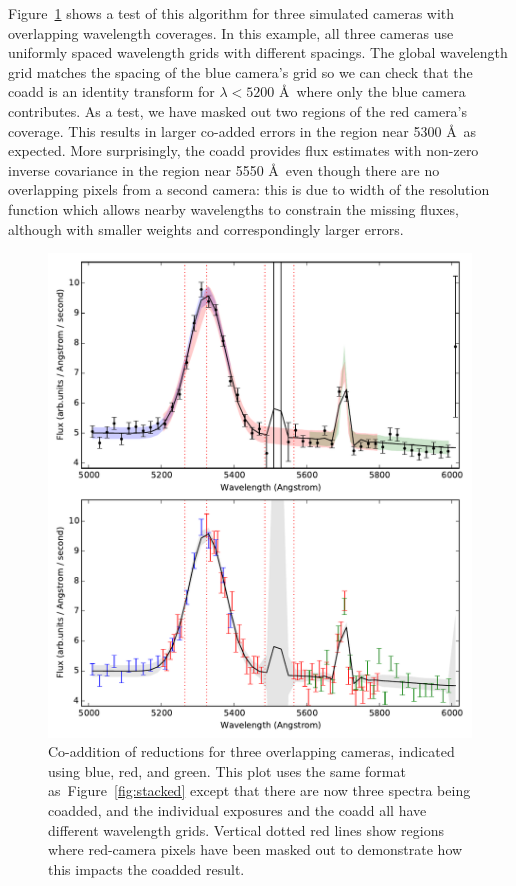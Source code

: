 \documentclass[12pt]{article}
\providecommand{\fig}[1]{Figure~\ref{fig:#1}}
\begin{document}
\fig{global} shows a test of this algorithm for three simulated cameras with overlapping wavelength coverages. In this example, all three cameras use uniformly spaced wavelength grids with different spacings.  The global wavelength grid matches the spacing of the blue camera's grid so we can check that the coadd is an identity transform for $\lambda < 5200$ \AA\ where only the blue camera contributes. As a test, we have masked out two regions of the red camera's coverage. This results in larger co-added errors in the region near 5300 \AA\, as expected. More surprisingly, the coadd provides flux estimates with non-zero inverse covariance in the region near 5550 \AA\, even though there are no overlapping pixels from a second camera: this is due to width of the resolution function which allows nearby wavelengths to constrain the missing fluxes, although with smaller weights and correspondingly larger errors.

\begin{figure}[htb]
\begin{center}
\includegraphics[width=5in]{fig/global}
\caption{Co-addition of reductions for three overlapping cameras, indicated using blue, red, and green. This plot uses the same format as~\fig{stacked} except that there are now three spectra being coadded, and the individual exposures and the coadd all have different wavelength grids. Vertical dotted red lines show regions where red-camera pixels have been masked out to demonstrate how this impacts the coadded result.}
\label{fig:global}
\end{center}
\end{figure}
\end{document}
